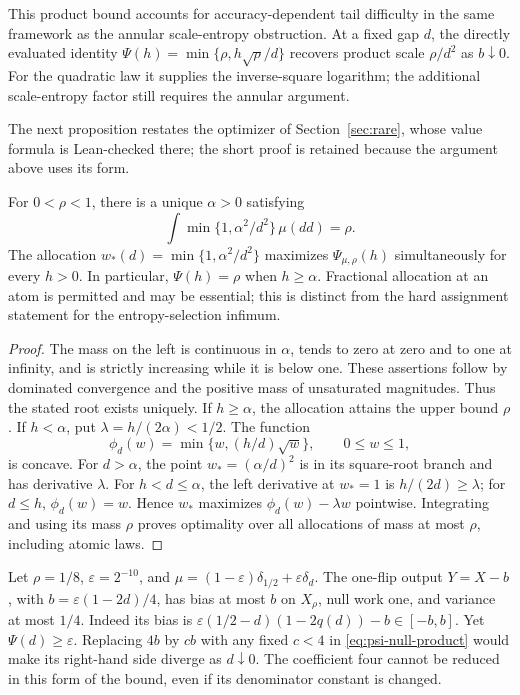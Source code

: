 This product bound accounts for accuracy-dependent tail difficulty in the
same framework as the annular scale-entropy obstruction.  At a fixed gap
\(d\), the directly evaluated identity
\(\Psi(h)=\min\{\rho,h\sqrt\rho/d\}\) recovers product scale
\(\rho/d^2\) as \(b\downarrow0\).  For the quadratic law it supplies
the inverse-square logarithm; the additional scale-entropy factor still
requires the annular argument.



The next proposition restates the optimizer of Section~\ref{sec:rare},
whose value formula is Lean-checked there; the short proof is retained
because the argument above uses its form.

\begin{proposition}
\label{prop:psi-optimizer}
For $0<\rho<1$, there is a unique $\alpha>0$ satisfying
\[
 \int\min\{1,\alpha^2/d^2\}\,\mu(dd)=\rho.
\]
The allocation $w_*(d)=\min\{1,\alpha^2/d^2\}$ maximizes
$\Psi_{\mu,\rho}(h)$ simultaneously for every $h>0$. In particular,
$\Psi(h)=\rho$ when $h\ge\alpha$. Fractional allocation at an atom is
permitted and may be essential; this is distinct from the hard
assignment statement for the entropy-selection infimum.
\end{proposition}
\begin{proof}
The mass on the left is continuous in $\alpha$, tends to zero at zero
and to one at infinity, and is strictly increasing while it is below
one. These assertions follow by dominated convergence and the positive
mass of unsaturated magnitudes. Thus the stated root exists uniquely.
If $h\ge\alpha$, the allocation attains the upper bound $\rho$.
If $h<\alpha$, put $\lambda=h/(2\alpha)<1/2$. The function
\[
 \phi_d(w)=\min\{w,(h/d)\sqrt w\},\qquad 0\le w\le1,
\]
is concave. For $d>\alpha$, the point $w_*=(\alpha/d)^2$ is in its
square-root branch and has derivative $\lambda$. For $h<d\le\alpha$,
the left derivative at $w_*=1$ is $h/(2d)\ge\lambda$; for $d\le h$,
$\phi_d(w)=w$. Hence $w_*$ maximizes $\phi_d(w)-\lambda w$
pointwise. Integrating and using its mass $\rho$ proves optimality over
all allocations of mass at most $\rho$, including atomic laws.
\end{proof}

\begin{remark}
Let $\rho=1/8$, $\varepsilon=2^{-10}$, and
$\mu=(1-\varepsilon)\delta_{1/2}+\varepsilon\delta_d$.
The one-flip output $Y=X-b$, with $b=\varepsilon(1-2d)/4$, has bias
at most $b$ on $X_\rho$, null work one, and variance at most $1/4$.
Indeed its bias is
$\varepsilon(1/2-d)(1-2q(d))-b\in[-b,b]$.
Yet $\Psi(d)\ge\varepsilon$. Replacing $4b$ by $cb$ with any fixed
$c<4$ in \eqref{eq:psi-null-product} would make its right-hand side
diverge as $d\downarrow0$. The coefficient four cannot be reduced in
this form of the bound, even if its denominator constant is changed.
\end{remark}

